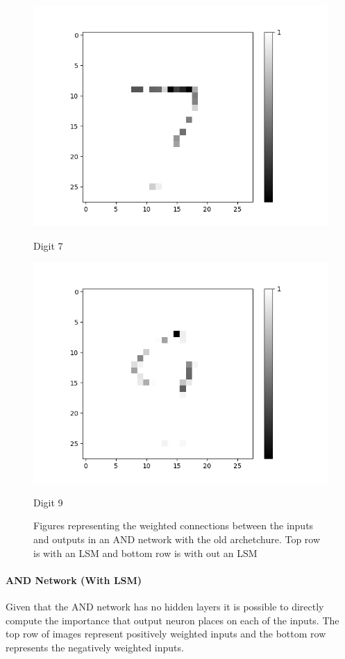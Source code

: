 \begin{figure}[H]
\begin{minipage}[b]{0.19\textwidth}
		\includegraphics[width=\textwidth]{AND-OLD(NO-LSM)/Layer0-Neuron-7.png}
		\caption{Digit 7}
	\end{minipage}
	\begin{minipage}[b]{0.19\textwidth}
		\includegraphics[width=\textwidth]{AND-OLD(NO-LSM)/Layer0-Neuron-9.png}
		\caption{Digit 9}
	\end{minipage}
	\hfill
	\caption{Figures representing the weighted connections between the inputs and outputs in an AND network with the old archetchure. Top row is with an LSM and bottom row is with out an LSM}
\end{figure}

\paragraph{AND Network (With LSM)}
Given that the AND network has no hidden layers it is possible to directly compute the importance that output neuron places on each of the inputs. The top row of images represent positively weighted inputs and the bottom row represents the negatively weighted inputs.\\


